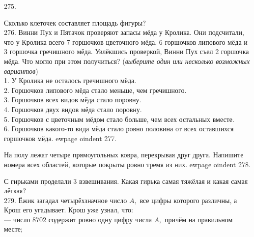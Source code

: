 \begin{center}
\begin{figure}[ht!]
\end{figure}
\end{center}
275. \begin{center}
\begin{figure}[ht!]
\end{figure}
\end{center}
Сколько клеточек составляет площадь фигуры?\\
276. Винни Пух и Пятачок проверяют запасы мёда у Кролика. Они подсчитали, что у Кролика всего 7 горшочков цветочного мёда, 6 горшочков липового мёда и 3 горшочка гречишного мёда. Увлёкшись проверкой, Винни Пух съел 2 горшочка мёда. Что могло при этом получиться? ({\it выберите один или несколько возможных вариантов})\\
1. У Кролика не осталось гречишного мёда.\\
2. Горшочков липового мёда стало меньше, чем гречишного.\\
3. Горшочков всех видов мёда стало поровну.\\
4. Горшочков двух видов мёда стало поровну.\\
5. Горшочков с цветочным мёдом стало больше, чем всех остальных вместе.\\
6. Горшочков какого-то вида мёда стало ровно половина от всех оставшихся горшочков мёда.
ewpage
oindent
277. \begin{center}
\begin{figure}[ht!]
\end{figure}
\end{center}
На полу лежат четыре прямоугольных ковра, перекрывая друг друга. Напишите номера всех областей, которые покрыты ровно тремя из них.
ewpage
oindent
278. \begin{center}
\begin{figure}[ht!]
\end{figure}
\end{center}
С гирьками проделали 3 взвешивания. Какая гирька самая тяжёлая и какая самая лёгкая?\\
279. Ёжик загадал четырёхзначное число $A,$ все цифры которого различны, а Крош его угадывает. Крош уже узнал, что:\\
 --- число 8702 содержит ровно одну цифру числа $A,$ причём на правильном месте;\\
